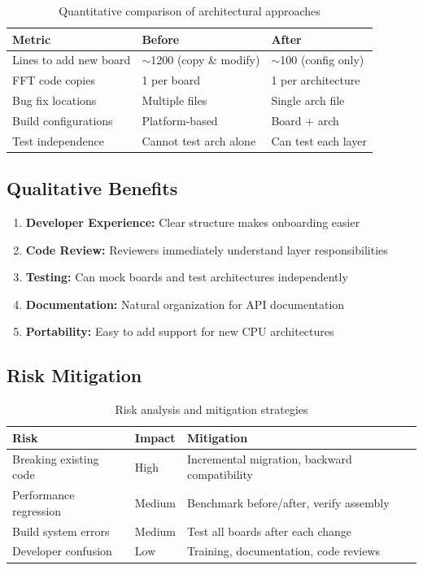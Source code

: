 \documentclass[11pt,a4paper]{article}
\begin{document}
\begin{table}[h]
\centering
\begin{tabularx}{\textwidth}{|l|X|X|}
\hline
\textbf{Metric} & \textbf{Before} & \textbf{After} \\
\hline
Lines to add new board & $\sim$1200 (copy \& modify) & $\sim$100 (config only) \\
\hline
FFT code copies & 1 per board & 1 per architecture \\
\hline
Bug fix locations & Multiple files & Single arch file \\
\hline
Build configurations & Platform-based & Board + arch \\
\hline
Test independence & Cannot test arch alone & Can test each layer \\
\hline
\end{tabularx}
\caption{Quantitative comparison of architectural approaches}
\label{tab:benefits}
\end{table}

\subsection{Qualitative Benefits}

\begin{enumerate}
    \item \textbf{Developer Experience:} Clear structure makes onboarding easier
    \item \textbf{Code Review:} Reviewers immediately understand layer responsibilities
    \item \textbf{Testing:} Can mock boards and test architectures independently
    \item \textbf{Documentation:} Natural organization for API documentation
    \item \textbf{Portability:} Easy to add support for new CPU architectures
\end{enumerate}

\subsection{Risk Mitigation}

\begin{table}[h]
\centering
\begin{tabularx}{\textwidth}{|l|l|X|}
\hline
\textbf{Risk} & \textbf{Impact} & \textbf{Mitigation} \\
\hline
Breaking existing code & High & Incremental migration, backward compatibility \\
\hline
Performance regression & Medium & Benchmark before/after, verify assembly \\
\hline
Build system errors & Medium & Test all boards after each change \\
\hline
Developer confusion & Low & Training, documentation, code reviews \\
\hline
\end{tabularx}
\caption{Risk analysis and mitigation strategies}
\end{table}
\end{document}
